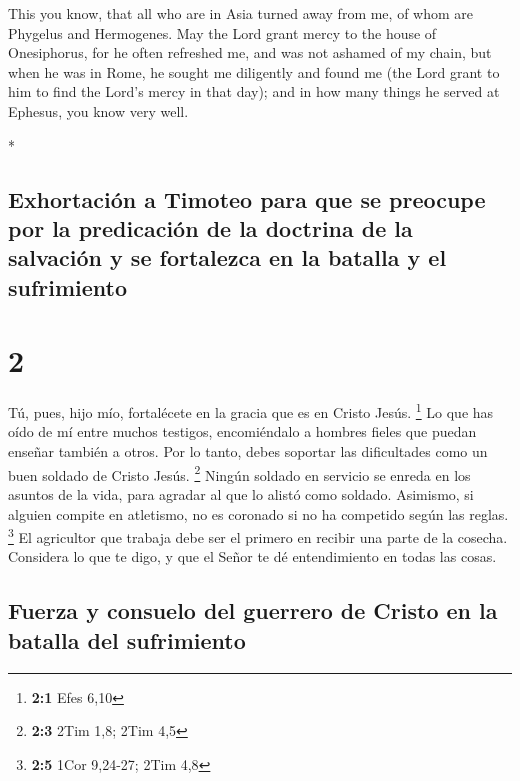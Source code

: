 \begin{paracol}{2}
\begin{otherlanguage}{english}
 This you know, that all who are in Asia turned away from
me, of whom are Phygelus and Hermogenes.  May the Lord
grant mercy to the house of Onesiphorus, for he often refreshed me, and
was not ashamed of my chain,  but when he was in Rome, he
sought me diligently and found me  (the Lord grant to him
to find the Lord's mercy in that day); and in how many things he served
at Ephesus, you know very well.

\end{otherlanguage}

\switchcolumn[0]*

\hypertarget{exhortaciuxf3n-a-timoteo-para-que-se-preocupe-por-la-predicaciuxf3n-de-la-doctrina-de-la-salvaciuxf3n-y-se-fortalezca-en-la-batalla-y-el-sufrimiento}{%
\subsection{Exhortación a Timoteo para que se preocupe por la
predicación de la doctrina de la salvación y se fortalezca en la batalla
y el
sufrimiento}\label{exhortaciuxf3n-a-timoteo-para-que-se-preocupe-por-la-predicaciuxf3n-de-la-doctrina-de-la-salvaciuxf3n-y-se-fortalezca-en-la-batalla-y-el-sufrimiento}}

\hypertarget{section-2}{%
\section{2}\label{section-2}}

 Tú, pues, hijo mío, fortalécete en la gracia que es en
Cristo Jesús. \footnote{\textbf{2:1} Efes 6,10}  Lo que
has oído de mí entre muchos testigos, encomiéndalo a hombres fieles que
puedan enseñar también a otros.  Por lo tanto, debes
soportar las dificultades como un buen soldado de Cristo Jesús.
\footnote{\textbf{2:3} 2Tim 1,8; 2Tim 4,5}  Ningún soldado
en servicio se enreda en los asuntos de la vida, para agradar al que lo
alistó como soldado.  Asimismo, si alguien compite en
atletismo, no es coronado si no ha competido según las reglas.
\footnote{\textbf{2:5} 1Cor 9,24-27; 2Tim 4,8}  El
agricultor que trabaja debe ser el primero en recibir una parte de la
cosecha.  Considera lo que te digo, y que el Señor te dé
entendimiento en todas las cosas.

\hypertarget{fuerza-y-consuelo-del-guerrero-de-cristo-en-la-batalla-del-sufrimiento}{%
\subsection{Fuerza y \hspace{0pt}\hspace{0pt}consuelo del guerrero de
Cristo en la batalla del
sufrimiento}\label{fuerza-y-consuelo-del-guerrero-de-cristo-en-la-batalla-del-sufrimiento}}


\end{paracol}
